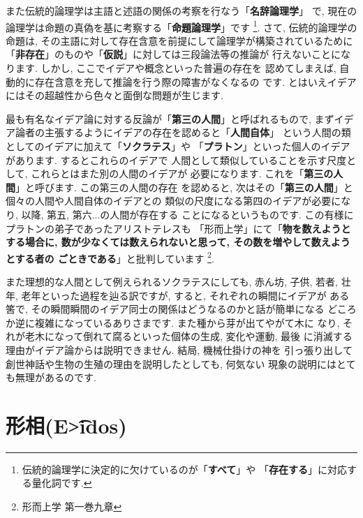 \documentclass[b5j,8pt,twocolumn]{ltjsarticle}
\newcommand{\textgreek}[1]{\begingroup\fontencoding{LGR}\selectfont#1\endgroup}
\newcommand{\textgreek}[1]{\begingroup\fontencoding{LGR}\selectfont#1\endgroup}
\begin{document}
また伝統的論理学は主語と述語の関係の考察を行なう「\textbf{名辞論理学}」
で, 現在の論理学は命題の真偽を基に考察する「\textbf{命題論理学}」です
\footnote{伝統的論理学に決定的に欠けているのが「\textbf{すべて}」や
「\textbf{存在する}」に対応する量化詞です.}. さて, 伝統的論理学の命題は,
 その主語に対して存在含意を前提にして論理学が構築されているために
「\textbf{非存在}」のものや「\textbf{仮説}」に対しては三段論法等の推論が
行えないことになります. しかし, ここでイデアや概念といった普遍の存在を
認めてしまえば, 自動的に存在含意を充して推論を行う際の障害がなくなるの
です. とはいえイデアにはその超越性から色々と面倒な問題が生じます.
\newline

最も有名なイデア論に対する反論が「\textbf{第三の人間}」と呼ばれるもので,
 まずイデア論者の主張するようにイデアの存在を認めると「\textbf{人間自体}」
という人間の類としてのイデアに加えて「\textbf{ソクラテス}」や
「\textbf{プラトン}」といった個人のイデアがあります. するとこれらのイデアで
人間として類似していることを示す尺度として, これらとはまた別の人間のイデアが
必要になります. これを「\textbf{第三の人間}」と呼びます. この第三の人間の存在
を認めると, 次はその「\textbf{第三の人間}」と個々の人間や人間自体のイデアとの
類似の尺度になる第四のイデアが必要になり, 以降, 第五, 第六...の人間が存在する
ことになるというものです.  この有様にプラトンの弟子であったアリストテレスも
「形而上学」\cite{アリストテレス2}にて「\textbf{物を数えようとする場合に,
 数が少なくては数えられないと思って, その数を増やして数えようとする者の
ごときである}」と批判しています\cite{アリストテレス2}
\footnote{形而上学 第一巻九章}.
\newline


また理想的な人間として例えられるソクラテスにしても, 赤ん坊, 子供, 若者,
 壮年, 老年といった過程を辿る訳ですが, すると, それぞれの瞬間にイデアが
ある筈で, その瞬間瞬間のイデア同士の関係はどうなるのかと話が簡単になる
どころか逆に複雑になっているありさまです. また種から芽が出てやがて木に
なり, それが老木になって倒れて腐るといった個体の生成, 変化や運動, 最後
に消滅する理由がイデア論からは説明できません. 結局, 機械仕掛けの神を
引っ張り出して創世神話や生物の生殖の理由を説明したとしても, 何気ない
現象の説明にはとても無理があるのです.


\section{形相(\textgreek{E\t{>i}dos})}
\end{document}

